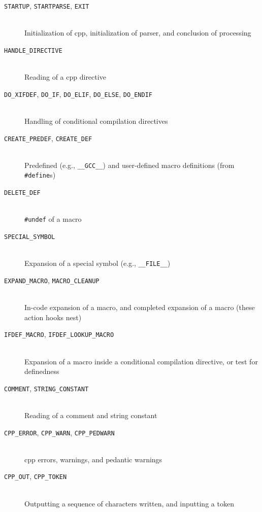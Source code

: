 \documentclass{article}
\newcommand{\Cpp}{\mbox{\textsf{cpp}}}
\newcommand{\shook}[1]{\texttt{#1}}
\newcommand{\ppd}[1]{\texttt{\##1}}
\newcommand{\eg}{e.g.,}
\begin{document}
\begin{description}
\item[\shook{STARTUP}, \shook{STARTPARSE}, \shook{EXIT}] ~ \\
  Initialization of \Cpp{}, initialization of parser, and conclusion of processing

\item[\shook{HANDLE\_DIRECTIVE}] ~ \\
  Reading of a \Cpp{} directive

\item[\shook{DO\_XIFDEF}, \shook{DO\_IF}, \shook{DO\_ELIF},
      \shook{DO\_ELSE}, \shook{DO\_ENDIF}] ~ \\
  Handling of conditional compilation directives

\item[\shook{CREATE\_PREDEF}, \shook{CREATE\_DEF}] ~ \\
  Predefined (\eg{} \verb+__GCC__+) and
  user-defined macro definitions (from \ppd{define}s)

\item[\shook{DELETE\_DEF}] ~ \\
  \ppd{undef} of a macro

\item[\shook{SPECIAL\_SYMBOL}] ~ \\
  Expansion of a special symbol (\eg{} \verb+__FILE__+)

\item[\shook{EXPAND\_MACRO}, \shook{MACRO\_CLEANUP}] ~ \\
  In-code expansion of a macro, and completed expansion of a
  macro (these action hooks nest)

\item[\shook{IFDEF\_MACRO}, \shook{IFDEF\_LOOKUP\_MACRO}] ~ \\
  Expansion of a macro inside a conditional compilation
  directive, or test for definedness

\item[\shook{COMMENT}, \shook{STRING\_CONSTANT}] ~ \\
  Reading of a comment and string constant

\item[\shook{CPP\_ERROR}, \shook{CPP\_WARN}, \shook{CPP\_PEDWARN}] ~ \\
  \Cpp{} errors, warnings, and pedantic warnings

\item[\shook{CPP\_OUT}, \shook{CPP\_TOKEN}] ~ \\
  Outputting a sequence of characters written, and inputting a token


\end{description}
\end{document}
